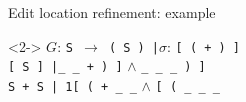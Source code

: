 \documentclass{beamer}
\begin{document}
\begin{frame}[fragile]{Edit location refinement: example}
\begin{onlyenv}
\begin{figure}[H]
{\begin{tikzpicture}
      \end{tikzpicture}
    }
  \end{figure}
  \end{onlyenv}
  \begin{onlyenv}<2->
  $G$: \texttt{S $\rightarrow$ ( S ) |}\hspace{1.4cm}$\sigma$: \texttt{[ ( + ) ]}\phantom{...}\\
  \texttt{[ S ] |}\texttt{\_ \_ + ) ]}\phantom{...}\phantom{...} $\land$ \phantom{...}\texttt{\_ \_ \_ ) ]}\phantom{...}\\
  \texttt{S + S | 1}\texttt{[ ( + \_ \_}\phantom{...}\phantom{...} $\land$ \phantom{...}\texttt{[ ( \_ \_ \_}\phantom{...}
  \end{onlyenv}
\end{frame}
\end{document}
